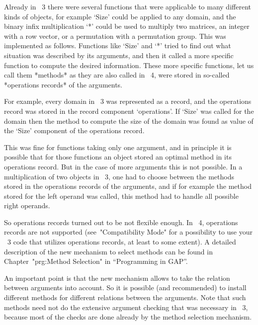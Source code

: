 
Already in {\GAP}~3 there were several functions that were applicable to
many different kinds of objects, for example `Size' could be applied to
any domain, and the binary infix multiplication `*' could be used to
multiply two matrices, an integer with a row vector, or a permutation
with a permutation group.
This was implemented as follows.
Functions like `Size' and `*' tried to find out what situation was
described by its arguments, and then it called a more specific function
to compute the desired information.
These more specific functions, let us call them *methods* as they are
also called in {\GAP}~4,
were stored in so-called *operations records* of the arguments.

For example, every domain in {\GAP}~3 was represented as a record, and
the operations record was stored in the record component `operations'.
If `Size' was called for the domain then the method to compute the size
of the domain was found as value of the `Size' component of the
operations record.

This was fine for functions taking only one argument,
and in principle it is possible that for those functions an object
stored an optimal method in its operations record.
But in the case of more arguments this is not possible.
In a multiplication of two objects in {\GAP}~3, one had to choose between
the methods stored in the operations records of the arguments,
and if for example the method stored for the left operand was called,
this method had to handle all possible right operands.

So operations records turned out to be not flexible enough.
In {\GAP}~4, operations records are not supported
(see~"Compatibility Mode" for a possibility to use your {\GAP}~3 code
that utilizes operations records, at least to some extent).
A detailed description of the new mechanism to select methods can be
found in Chapter~"prg:Method Selection" in ``Programming in GAP''.

An important point is that the new mechanism allows {\GAP} to take the
relation between arguments into account.
So it is possible (and recommended) to install different methods for
different relations between the arguments.
Note that such methods need not do the extensive argument checking
that was necessary in {\GAP}~3, because most of the checks are done
already by the method selection mechanism.



